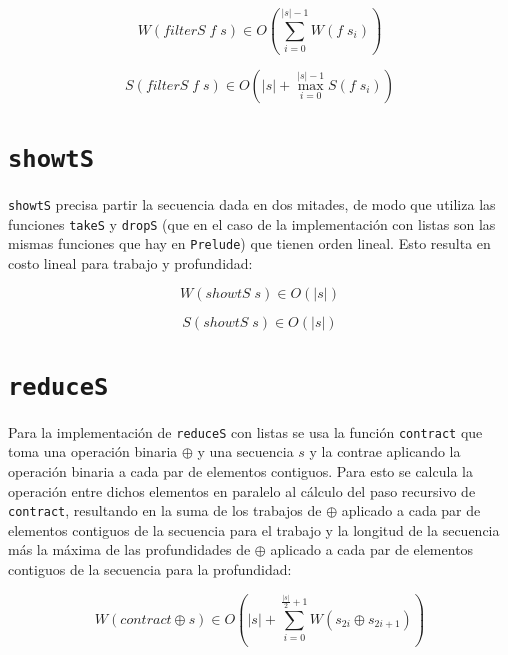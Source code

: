 \documentclass[a4paper,10pt]{article}
\begin{document}
\begin{equation*}
    W \left( filterS\; f \; s \right) \in
    O \left( \sum_{i=0}^{\vert s \vert -1} W \left( f \; s_i \right) \right)
\end{equation*}

\begin{equation*}
    S \left( filterS\; f \; s \right) \in
    O \left( \vert s \vert + \max_{i=0}^{\vert s \vert -1} S \left( f \; s_i \right) \right)
\end{equation*}


\section*{\texttt{showtS}}

\texttt{showtS} precisa partir la secuencia dada en dos mitades, de modo que
utiliza las funciones \texttt{takeS} y \texttt{dropS} (que en el caso de la
implementación con listas son las mismas funciones que hay en \texttt{Prelude})
que tienen orden lineal. Esto resulta en costo lineal para trabajo y profundidad:

\begin{equation*}
    W \left( showtS \; s \right) \in
    O \left( \vert s \vert \right)
\end{equation*}

\begin{equation*}
    S \left( showtS \; s \right) \in
    O \left( \vert s \vert \right)
\end{equation*}


\section*{\texttt{reduceS}}

Para la implementación de \texttt{reduceS} con listas se usa la función \texttt{contract}
que toma una operación binaria $\oplus$ y una secuencia $s$ y la contrae aplicando
la operación binaria a cada par de elementos contiguos. Para esto se calcula la
operación entre dichos elementos en paralelo al cálculo del paso recursivo de
\texttt{contract}, resultando en la suma de los trabajos de $\oplus$ aplicado a
cada par de elementos contiguos de la secuencia para el trabajo y la longitud de
la secuencia más la máxima de las profundidades de $\oplus$ aplicado a cada par de
elementos contiguos de la secuencia para la profundidad:

\begin{equation*}
    W \left( contract \oplus s \right) \in
    O \left( \vert s \vert + \sum_{i=0}^{\frac{\vert s \vert}{2} + 1} W \left( s_{2i} \oplus s_{2i+1} \right) \right)
\end{equation*}
\end{document}
